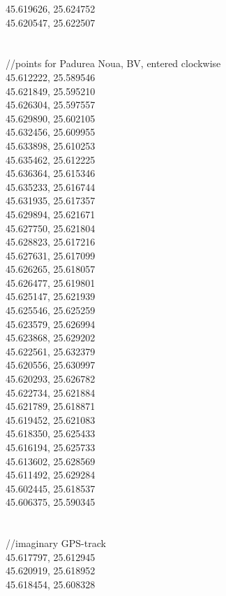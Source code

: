 \documentclass {article}
\begin{document}
\begin{appendices}
45.619626, 25.624752\\
45.620547, 25.622507\\
\\
\\
//points for Padurea Noua, BV, entered clockwise\\
45.612222, 25.589546\\
45.621849, 25.595210\\
45.626304, 25.597557\\
45.629890, 25.602105\\
45.632456, 25.609955\\
45.633898, 25.610253\\
45.635462, 25.612225\\
45.636364, 25.615346\\
45.635233, 25.616744\\
45.631935, 25.617357\\
45.629894, 25.621671\\
45.627750, 25.621804\\
45.628823, 25.617216\\
45.627631, 25.617099\\
45.626265, 25.618057\\
45.626477, 25.619801\\
45.625147, 25.621939\\
45.625546, 25.625259\\
45.623579, 25.626994\\
45.623868, 25.629202\\
45.622561, 25.632379\\
45.620556, 25.630997\\
45.620293, 25.626782\\
45.622734, 25.621884\\
45.621789, 25.618871\\
45.619452, 25.621083\\
45.618350, 25.625433\\
45.616194, 25.625733\\
45.613602, 25.628569\\
45.611492, 25.629284\\
45.602445, 25.618537\\
45.606375, 25.590345\\
\\
\\
//imaginary GPS-track\\
45.617797, 25.612945\\
45.620919, 25.618952\\
45.618454, 25.608328\\

\end{appendices}
\end{document}

